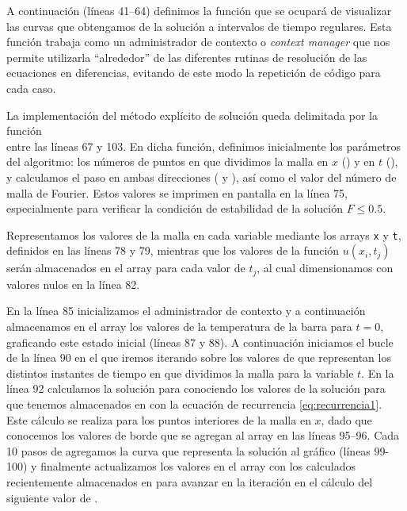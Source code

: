 A continuación (líneas 41--64) definimos la función  que se ocupará de visualizar las curvas que obtengamos de la solución a intervalos de tiempo regulares. Esta función trabaja como un administrador de contexto o \textit{context manager} que nos permite utilizarla ``alrededor'' de las diferentes rutinas de resolución de las ecuaciones en diferencias, evitando de este modo la repetición de código para cada caso. 


La implementación del método explícito de solución queda delimitada por la función \\  entre las líneas 67 y 103. En dicha función, definimos inicialmente los parámetros del algoritmo: los números de puntos en que dividimos la malla en $x$ () y en $t$ (), y calculamos el paso en ambas direcciones ( y ), así como el valor del número de malla de Fourier. Estos valores se imprimen en pantalla en la línea 75, especialmente para verificar la condición de estabilidad de la solución $F \leq 0.5$.

Representamos los valores de la malla en cada variable mediante los arrays \verb|x| y \verb|t|, definidos en las líneas 78 y 79, mientras que los valores de la función $u(x_i, t_j)$ serán almacenados en el array  para cada valor de $t_j$, al cual dimensionamos con  valores nulos en la línea 82.

En la línea 85 inicializamos el administrador de contexto y a continuación almacenamos en el array  los valores de la temperatura de la barra para $t=0$, graficando este estado inicial (líneas 87 y 88). A continuación iniciamos el bucle de la línea 90 en el que iremos iterando sobre los valores de  que representan los distintos instantes de tiempo en que dividimos la malla para la variable $t$. En la línea 92 calculamos la solución para  conociendo los valores de la solución para  que tenemos almacenados en  con la ecuación de recurrencia \eqref{eq:recurrencia1}. Este cálculo se realiza para los puntos interiores de la malla en $x$, dado que conocemos los valores de borde que se agregan al array  en las líneas 95--96. Cada 10 pasos de  agregamos la curva que representa la solución al gráfico (líneas 99-100) y finalmente actualizamos los valores en el array  con los calculados recientemente almacenados en  para avanzar en la iteración en el cálculo del siguiente valor de .

